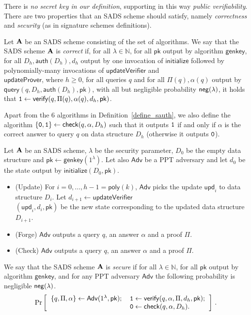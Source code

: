 There is \emph{no secret key in our definition}, supporting in this way \emph{public verifiability}. There are two properties that an SADS scheme should satisfy, namely
\emph{correctness} and \emph{security} (as in signature
schemes definitions).

\begin{defn}[Correctness]\label{sound_def}
  Let ${\bf A}$ be an SADS scheme consisting of the set of algorithms. We say that the SADS
  scheme ${\bf A}$ is \emph{correct} if, for all $\lambda \in
  \mathbb{N}$, for all $\mathsf{pk}$ output by algorithm
  $\mathsf{genkey}$, for all $D_h,\mathsf{auth}(D_h),d_h$ output by one
  invocation of $\mathsf{initialize}$ followed by polynomially-many
  invocations of $\mathsf{updateVerifier}$ and \\
   $\mathsf{updateProver}$, where $h\ge 0$, for all queries $q$
  and for all $\Pi(q),\alpha(q)$ output by
  $\mathsf{query}(q,D_h,\mathsf{auth}(D_h),\mathsf{pk})$, with all but
  negligible probability $\mathsf{neg}(\lambda)$, it holds that ${\tt{1}}\leftarrow\mathsf{verify}(q,\Pi(q),\alpha(q),d_h,\mathsf{pk})$.
\end{defn}

Apart from the 6 algorithms in Definition~\ref{define_sauth}, we also define the algorithm $\{{\tt{0},\tt{1}}\}\leftarrow\mathsf{check}(q,\alpha,D_{h})$ such that it outputs ${\tt{1}}$ if and only if $\alpha$ is the correct answer to query $q$ on data structure $D_h$ (otherwise it outputs ${\tt{0}}$).  

\begin{defn}[Security]\label{sec_def_general}
  Let ${\bf A}$ be an SADS scheme, $\lambda$ be the security
  parameter, $D_0$ be the empty data structure and
  $\mathsf{pk} \leftarrow \mathsf{genkey}(1^{\lambda})$. Let also
  $\mathsf{Adv}$ be a PPT adversary and let $d_0$ be the state output by $\mathsf{initialize}(D_0,\mathsf{pk})$. 
\begin{itemize}
\item (Update) For $i=0,\ldots,h-1=\mathsf{poly}(k)$, $\mathsf{Adv}$ picks the update $\mathsf{upd}_i$ to data structure $D_i$. Let $d_{i+1}\leftarrow\mathsf{updateVerifier}$\\
$(\mathsf{upd}_i,d_i,\mathsf{pk})$ be the new state corresponding to the updated data structure $D_{i+1}$.
\item (Forge)  $\mathsf{Adv}$ outputs a query $q$, an answer $\alpha$ and a proof $\Pi$.
\item (Check)  $\mathsf{Adv}$ outputs a query $q$, an answer $\alpha$ and a proof $\Pi$.
\end{itemize}
 We say that the SADS scheme ${\bf A}$ is \emph{secure} if for all $\lambda \in \mathbb{N}$, for all
  $\mathsf{pk}$ output by algorithm $\mathsf{genkey}$,
  and for any PPT adversary $\mathsf{Adv}$ the following probability is negligible $\mathsf{neg}(\lambda)$.
\[
\label{lab:prob_sec}
\Pr\left[
\begin{tabular}{rl}
    $\{q,\Pi,\alpha\}\leftarrow\mathsf{Adv}(1^{\lambda},\mathsf{pk});$&${\tt{1}}\leftarrow \mathsf{verify}(q,\alpha,\Pi,d_h,\mathsf{pk});$\\
    &${\tt{0}}\leftarrow\mathsf{check}(q,\alpha,D_{h}).$
  \end{tabular}\right]\,.
\]
\end{defn}

